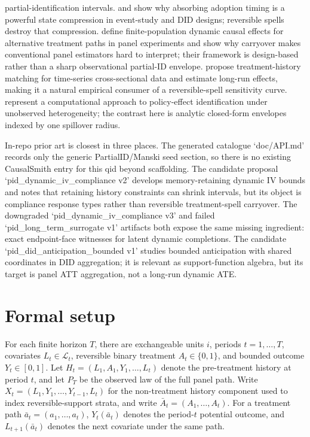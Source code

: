 \documentclass[11pt]{article}
\theoremstyle{definition}
\theoremstyle{plain}
\theoremstyle{remark}
\begin{document}
partial-identification intervals.  \citet{SunAbraham2021} and
\citet{CallawaySantAnna2021} show why absorbing adoption timing is a powerful
state compression in event-study and DID designs; reversible spells destroy
that compression.  \citet{BojinovRambachanShephard2021} define finite-population
dynamic causal effects for alternative treatment paths in panel experiments and
show why carryover makes conventional panel estimators hard to interpret; their
framework is design-based rather than a sharp observational partial-ID envelope.
\citet{ImaiKimWang2023} propose treatment-history matching
for time-series cross-sectional data and estimate long-run effects, making it a
natural empirical consumer of a reversible-spell sensitivity curve.
\citet{HanYang2024} represent a computational approach to policy-effect
identification under unobserved heterogeneity; the contrast here is analytic
closed-form envelopes indexed by one spillover radius.

In-repo prior art is closest in three places.  The generated catalogue
`doc/API.md' records only the generic PartialID/Manski seed section, so there
is no existing CausalSmith entry for this qid beyond scaffolding.  The candidate
proposal `pid\_dynamic\_iv\_compliance v2' develops memory-retaining dynamic IV
bounds and notes that retaining history constraints can shrink intervals, but
its object is compliance response types rather than reversible treatment-spell
carryover.  The downgraded `pid\_dynamic\_iv\_compliance v3' and failed
`pid\_long\_term\_surrogate v1' artifacts both expose the same missing
ingredient: exact endpoint-face witnesses for latent dynamic completions.  The
candidate `pid\_did\_anticipation\_bounded v1' studies bounded anticipation
with shared coordinates in DID aggregation; it is relevant as support-function
algebra, but its target is panel ATT aggregation, not a long-run dynamic ATE.

\section{Formal setup}
\label{sec:setup}
For each finite horizon \(T\), there are exchangeable units \(i\), periods
\(t=1,\ldots,T\), covariates
\(L_t\in\mathcal L_t\), reversible binary treatment \(A_t\in\{0,1\}\), and
bounded outcome \(Y_t\in[0,1]\).  Let
\(H_t=(L_1,A_1,Y_1,\ldots,L_t)\) denote the pre-treatment history at period
\(t\), and let \(P_T\) be the observed law of the full panel path.  Write
\(X_t=(L_1,Y_1,\ldots,Y_{t-1},L_t)\) for the non-treatment history component
used to index reversible-support strata, and write
\(\bar A_t=(A_1,\ldots,A_t)\).  For a
treatment path \(\bar a_t=(a_1,\ldots,a_t)\), \(Y_t(\bar a_t)\) denotes the
period-\(t\) potential outcome, and \(L_{t+1}(\bar a_t)\) denotes the next
covariate under the same path.
\end{document}
